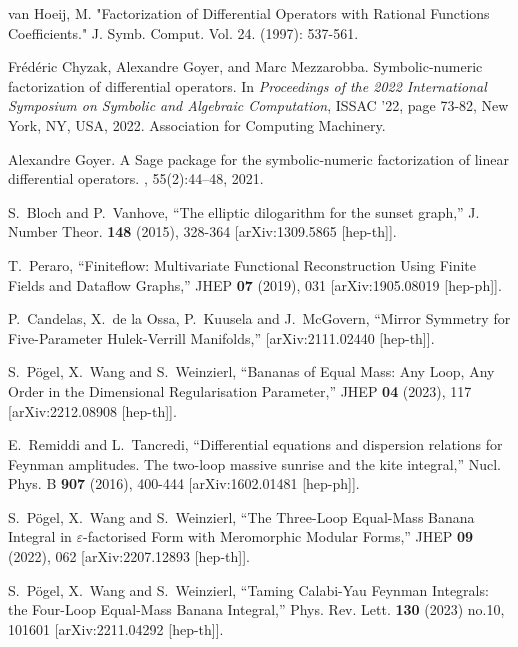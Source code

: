 \documentclass[a4paper,12pt]{article}
\numberwithin{equation}{section}
\numberwithin{figure}{section}
\begin{document}
\begin{thebibliography}{99}
  van Hoeij, M. "Factorization of Differential Operators with Rational Functions Coefficients." J. Symb. Comput. Vol. 24. (1997): 537-561.

Fr\'{e}d\'{e}ric Chyzak, Alexandre Goyer, and Marc Mezzarobba.
\newblock Symbolic-numeric factorization of differential operators.
\newblock In {\em Proceedings of the 2022 International Symposium on Symbolic
  and Algebraic Computation}, ISSAC '22, page 73-82, New York, NY, USA, 2022.
Association for Computing Machinery.
\newblock [arXiv:2205.08991]

Alexandre Goyer.
\newblock A {S}age package for the symbolic-numeric factorization of linear
  differential operators.
, 55(2):44--48,
2021.

S.~Bloch and P.~Vanhove,
``The elliptic dilogarithm for the sunset graph,''
J. Number Theor. \textbf{148} (2015), 328-364
[arXiv:1309.5865 [hep-th]].
  
T.~Peraro,
``Finiteflow: Multivariate Functional Reconstruction Using Finite Fields and Dataflow Graphs,''
JHEP \textbf{07} (2019), 031
[arXiv:1905.08019 [hep-ph]].

P.~Candelas, X.~de la Ossa, P.~Kuusela and J.~McGovern,
``Mirror Symmetry for Five-Parameter Hulek-Verrill Manifolds,''
[arXiv:2111.02440 [hep-th]].

S.~P\"ogel, X.~Wang and S.~Weinzierl,
``Bananas of Equal Mass: Any Loop, Any Order in the Dimensional Regularisation Parameter,''
JHEP \textbf{04} (2023), 117
[arXiv:2212.08908 [hep-th]].

 

E.~Remiddi and L.~Tancredi,
``Differential equations and dispersion relations for Feynman amplitudes. The two-loop massive sunrise and the kite integral,''
Nucl. Phys. B \textbf{907} (2016), 400-444
[arXiv:1602.01481 [hep-ph]].

S.~P\"ogel, X.~Wang and S.~Weinzierl,
``The Three-Loop Equal-Mass Banana Integral in \ensuremath{\varepsilon}-factorised Form with Meromorphic Modular Forms,''
JHEP \textbf{09} (2022), 062
[arXiv:2207.12893 [hep-th]].


S.~P\"ogel, X.~Wang and S.~Weinzierl,
``Taming Calabi-Yau Feynman Integrals: the Four-Loop Equal-Mass Banana Integral,''
Phys. Rev. Lett. \textbf{130} (2023) no.10, 101601
[arXiv:2211.04292 [hep-th]].
  

\end{thebibliography}
\end{document}
